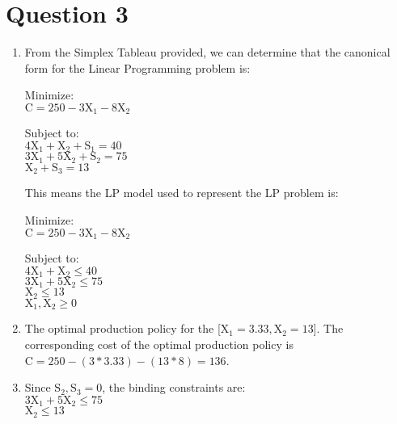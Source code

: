 \section*{Question 3}
\begin{enumerate}

\item
From the Simplex Tableau provided, we can determine that the canonical form for the Linear Programming problem is:

Minimize:\\
$\text{C} = 250 - 3\text{X}_1 - 8\text{X}_2$

Subject to:\\
$4\text{X}_1 + \text{X}_2 + \text{S}_1 = 40$ \\
$3\text{X}_1 + 5\text{X}_2 + \text{S}_2 = 75$ \\
$\text{X}_2 + \text{S}_3 = 13$

This means the LP model used to represent the LP problem is:

Minimize:\\
$\text{C} = 250 - 3\text{X}_1 - 8\text{X}_2$

Subject to:\\
	$4\text{X}_1 + \text{X}_2 \leq 40$ \\
	$3\text{X}_1 + 5\text{X}_2 \leq 75$ \\
	$\text{X}_2 \leq 13$ \\
	$\text{X}_1, \text{X}_2 \geq 0$

	
\item
The optimal production policy for the [$\text{X}_1 = 3.33, \text{X}_2 = 13$]. The corresponding cost of the optimal production policy is $\text{C} = 250 - (3*3.33) - (13*8) = 136$.

\item
Since $\text{S}_2, \text{S}_3 = 0$, the binding constraints are:\\
$3\text{X}_1 + 5\text{X}_2 \leq 75$ \\
$\text{X}_2 \leq 13$ \\

\end{enumerate}